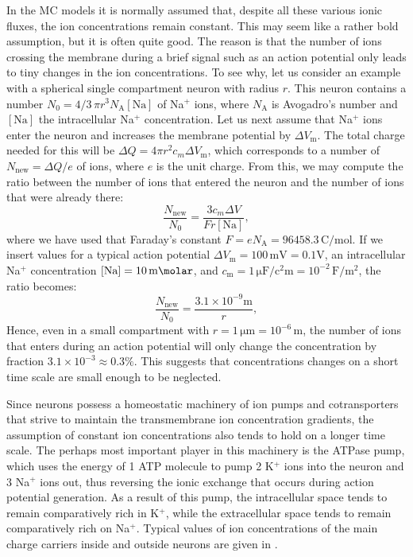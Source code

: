 In the MC models it is normally assumed that, despite all these various ionic fluxes, the ion concentrations remain constant. This may seem like a rather bold assumption, but it is often quite good. The reason is that the number of ions crossing the membrane during a brief signal such as an action potential only leads to tiny changes in the ion concentrations. To see why, let us consider an example with a spherical single compartment neuron with radius $r$. This neuron contains a number $N_0 = 4/3 \,\pi r^3 N_\text{A} [\text{Na}]$ of Na$^{+}$ ions, where $N_\text{A}$ is Avogadro's number and $[\text{Na}]$ the intracellular Na$^{+}$ concentration. Let us next assume that Na$^+$ ions enter the neuron and increases the membrane potential by $\Delta V_\mathrm{m}$. The total charge needed for this will be $\Delta Q = 4 \pi r^2 c_m \Delta V_\mathrm{m}$, which corresponds to a number of $N_\text{new} = \Delta Q/e$ of ions, where $e$ is the unit charge. From this, we may compute the ratio between the number of ions that entered the neuron and the number of ions that were already there:
\begin{equation}
\frac{N_\text{new}}{N_0} = \frac{3 c_m \Delta V}{F r [\text{Na}]}, 
\label{eq:Neuron:NaNaNa}
\end{equation}
where we have used that Faraday's constant $F = eN_\text{A} = 96458.3 \, \si{\coulomb\per\mol}$. If we insert values for a typical action potential $\Delta V_\mathrm{m} = 100 \,\si{\milli\volt} = 0.1 \si{\volt}$, an intracellular Na$^+$ concentration $[\text{Na}] = 10 \, \si{\milli\molar}$, and $c_\text{m} = 1 \, \si{\micro\farad\per\square\centi\metre} = 10^{-2}\, \si{\farad\per\square\metre}$, the ratio becomes:
\begin{equation}
\frac{N_\text{new}}{N_0} = \frac{3.1 \times 10^{-9} \si{\metre}}{r}, 
\label{eq:Neuron:NaNaNaNa}
\end{equation}
Hence, even in a small compartment with $r=1\,\si{\micro\metre} = 10^{-6}\,\si{\metre}$, the number of ions that enters during an action potential will only change the concentration by fraction $3.1 \times 10^{-3} \approx 0.3 \%$. This suggests that concentrations changes on a short time scale are small enough to be neglected.

Since neurons possess a homeostatic machinery of ion pumps and cotransporters that strive to maintain the transmembrane 
ion concentration gradients, the assumption of constant ion concentrations also tends to hold on a longer time scale. The perhaps most important player in this machinery is the ATPase pump, which uses the energy of 1 ATP molecule to pump 2 K$^+$ ions into the neuron and 3 Na$^+$ ions out, thus reversing the ionic exchange that occurs during action potential generation. As a result of this pump, the intracellular space tends to remain comparatively rich in K$^+$, while the extracellular space tends to remain comparatively rich on Na$^+$. Typical values of ion concentrations of the main charge carriers inside and outside neurons are given in . 

